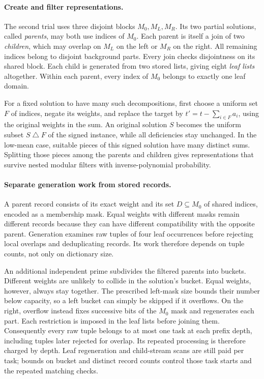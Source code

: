 \paragraph{Create and filter representations.}
The second trial uses three disjoint blocks $M_0,M_L,M_R$. Its two
partial solutions, called \emph{parents}, may both use indices of
$M_0$. Each parent is itself a join of two \emph{children}, which
may overlap on $M_L$ on the left or $M_R$ on the right. All remaining
indices belong to disjoint background parts. Every join checks
disjointness on its shared block. Each child is generated from two
stored lists, giving eight \emph{leaf lists} altogether. Within each
parent, every index of $M_0$ belongs to exactly one leaf domain.

For a fixed solution to have many such decompositions, first choose a
uniform set $F$ of indices, negate its weights, and replace the target
by $t'=t-\sum_{i\in F}a_i$, using the original weights in the sum.
An original solution $S$ becomes the
uniform subset $S\mathbin{\triangle}F$ of the signed instance, while
all deficiencies stay unchanged. In the low-mean case, suitable pieces
of this signed solution have many distinct sums. Splitting those pieces
among the parents and children gives representations that survive
nested modular filters with inverse-polynomial probability.

\paragraph{Separate generation work from stored records.}
A parent record consists of its exact weight and its set
$D\subseteq M_0$ of shared indices, encoded as a membership mask.
Equal weights with different masks
remain different records because they can have different compatibility
with the opposite parent. Generation examines raw tuples of four leaf
occurrences before rejecting local overlaps and deduplicating records.
Its work therefore depends on tuple counts, not only on dictionary size.

An additional independent prime subdivides the filtered parents into
buckets. Different weights are unlikely to collide in the solution's
bucket. Equal weights, however, always stay together. The prescribed
left-mask size bounds their number below capacity, so a left bucket
can simply be skipped if it overflows. On the right, overflow instead
fixes successive bits of the $M_0$ mask and regenerates each part.
Each restriction is imposed in the leaf lists before joining them.
Consequently every raw tuple belongs to at most one task at each
prefix depth, including tuples later rejected for overlap. Its repeated
processing is therefore charged by depth. Leaf regeneration and
child-stream scans are still paid per task; bounds on bucket and distinct
record counts control those task starts and the repeated matching checks.

